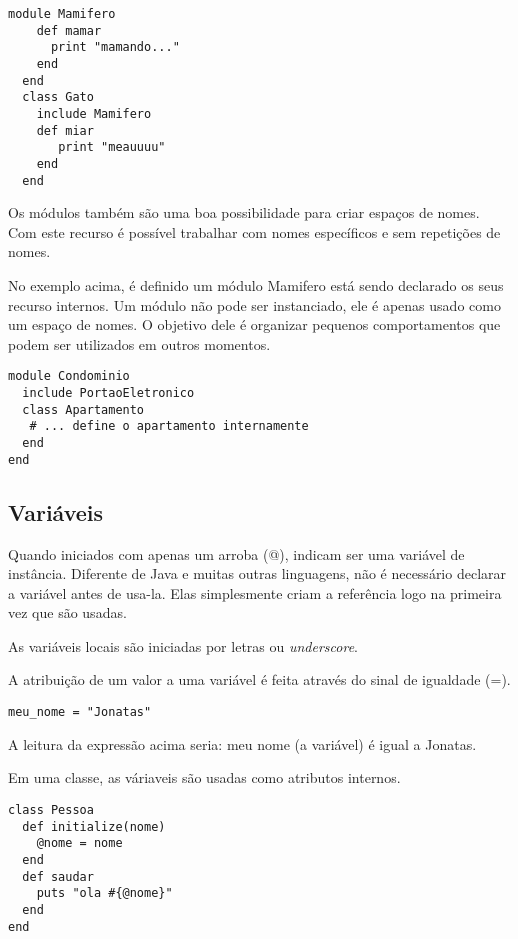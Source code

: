 \documentclass[espaco=simples,appendix=Name]{abnt}
\begin{document}
\begin{lstlisting}[caption=Exemplo de módulo ]
  module Mamifero
    def mamar
      print "mamando..."
    end
  end
  class Gato
    include Mamifero
    def miar
       print "meauuuu"
    end
  end
\end{lstlisting}

Os módulos também são uma boa possibilidade para criar espaços de nomes. Com este recurso é possível trabalhar com nomes específicos e sem repetições de nomes.

No exemplo acima, é definido um módulo Mamifero está sendo declarado os seus recurso internos. Um módulo não pode ser instanciado, ele é apenas usado como um espaço de nomes. O objetivo dele é organizar pequenos comportamentos que podem ser utilizados em outros momentos.

\begin{lstlisting}[caption=Exemplo de módulo como espaço ]
module Condominio
  include PortaoEletronico
  class Apartamento
   # ... define o apartamento internamente
  end
end 
\end{lstlisting}

\subsection{ Variáveis } 

Quando iniciados com apenas um arroba (@), indicam ser uma variável de instância. Diferente de Java e muitas outras linguagens, não é necessário declarar a variável antes de usa-la. Elas simplesmente criam a referência logo na primeira vez que são usadas.

As variáveis locais são iniciadas por letras ou \textit{underscore}.

A atribuição de um valor a uma variável é feita através do sinal de igualdade (=).

\begin{lstlisting}[caption=Exemplo de variável local ]
meu_nome = "Jonatas"
\end{lstlisting}

A leitura da expressão acima seria: meu nome (a variável) é igual a Jonatas.

Em uma classe, as váriaveis são usadas como atributos internos.

\begin{lstlisting}[caption=Exemplo de variável de instância em uma classe ]
class Pessoa
  def initialize(nome)
    @nome = nome
  end
  def saudar
    puts "ola #{@nome}"
  end
end
\end{lstlisting}
\end{document}

